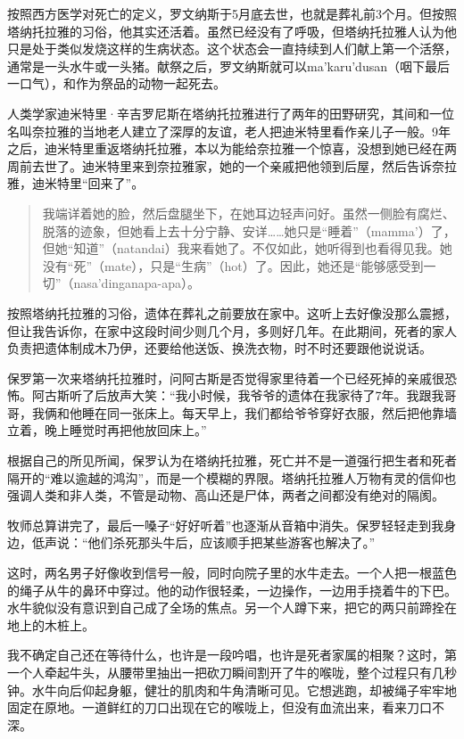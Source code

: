 \documentclass[12pt,oneside]{book}
\begin{document}
\begin{bookref}[frametitle={\cite{好好告别}}]
按照西方医学对死亡的定义，罗文纳斯于5月底去世，也就是葬礼前3个月。但按照塔纳托拉雅的习俗，他其实还活着。虽然已经没有了呼吸，但塔纳托拉雅人认为他只是处于类似发烧这样的生病状态。这个状态会一直持续到人们献上第一个活祭，通常是一头水牛或一头猪。献祭之后，罗文纳斯就可以ma’karu’dusan（咽下最后一口气），和作为祭品的动物一起死去。

人类学家迪米特里·辛吉罗尼斯在塔纳托拉雅进行了两年的田野研究，其间和一位名叫奈拉雅的当地老人建立了深厚的友谊，老人把迪米特里看作亲儿子一般。9年之后，迪米特里重返塔纳托拉雅，本以为能给奈拉雅一个惊喜，没想到她已经在两周前去世了。迪米特里来到奈拉雅家，她的一个亲戚把他领到后屋，然后告诉奈拉雅，迪米特里“回来了”。

\begin{quotation}
我端详着她的脸，然后盘腿坐下，在她耳边轻声问好。虽然一侧脸有腐烂、脱落的迹象，但她看上去十分宁静、安详……她只是“睡着”（mamma’）了，但她“知道”（natandai）我来看她了。不仅如此，她听得到也看得见我。她没有“死”（mate），只是“生病”（hot）了。因此，她还是“能够感受到一切”（nasa’dinganapa-apa）。
\end{quotation}

按照塔纳托拉雅的习俗，遗体在葬礼之前要放在家中。这听上去好像没那么震撼，但让我告诉你，在家中这段时间少则几个月，多则好几年。在此期间，死者的家人负责把遗体制成木乃伊，还要给他送饭、换洗衣物，时不时还要跟他说说话。

保罗第一次来塔纳托拉雅时，问阿古斯是否觉得家里待着一个已经死掉的亲戚很恐怖。阿古斯听了后放声大笑：“我小时候，我爷爷的遗体在我家待了7年。我跟我哥哥，我俩和他睡在同一张床上。每天早上，我们都给爷爷穿好衣服，然后把他靠墙立着，晚上睡觉时再把他放回床上。”

根据自己的所见所闻，保罗认为在塔纳托拉雅，死亡并不是一道强行把生者和死者隔开的“难以逾越的鸿沟”，而是一个模糊的界限。塔纳托拉雅人万物有灵的信仰也强调人类和非人类，不管是动物、高山还是尸体，两者之间都没有绝对的隔阂。

牧师总算讲完了，最后一嗓子“好好听着”也逐渐从音箱中消失。保罗轻轻走到我身边，低声说：“他们杀死那头牛后，应该顺手把某些游客也解决了。”

这时，两名男子好像收到信号一般，同时向院子里的水牛走去。一个人把一根蓝色的绳子从牛的鼻环中穿过。他的动作很轻柔，一边操作，一边用手挠着牛的下巴。水牛貌似没有意识到自己成了全场的焦点。另一个人蹲下来，把它的两只前蹄拴在地上的木桩上。

我不确定自己还在等待什么，也许是一段吟唱，也许是死者家属的相聚？这时，第一个人牵起牛头，从腰带里抽出一把砍刀瞬间割开了牛的喉咙，整个过程只有几秒钟。水牛向后仰起身躯，健壮的肌肉和牛角清晰可见。它想逃跑，却被绳子牢牢地固定在原地。一道鲜红的刀口出现在它的喉咙上，但没有血流出来，看来刀口不深。


\end{bookref}
\end{document}

